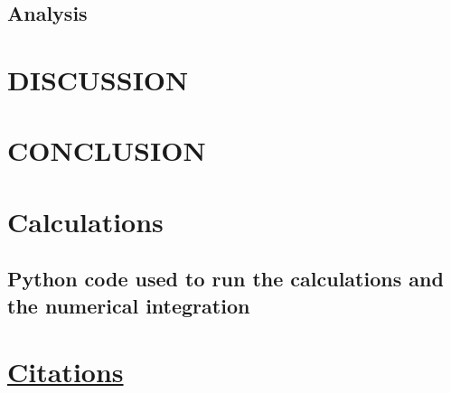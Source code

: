 \documentclass[%
 aapm,
 mph,%
 amsmath,amssymb,
 reprint,%
]{revtex4-2}
\begin{document}
\subsection{Analysis}


\newpage
\section{DISCUSSION}


\section{CONCLUSION}


{
\appendix
\section{Calculations}
\subsection{\label{app:python}Python code used to run the calculations and the numerical integration}


}


\nocite{*}
\section*{\underline{Citations}}
\end{document}
